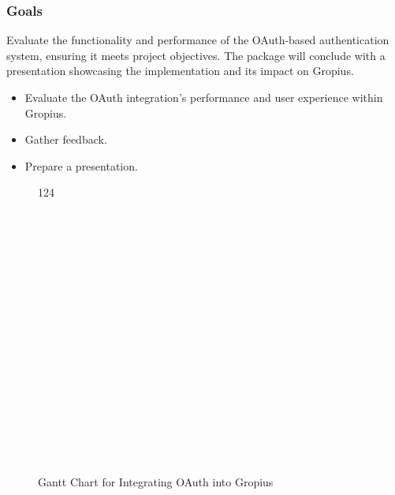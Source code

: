 
\subsubsection{Goals}
Evaluate the functionality and performance of the OAuth-based authentication system, ensuring it meets project objectives. The package will conclude with a presentation showcasing the implementation and its impact on Gropius.

\begin{itemize}
	\item[T5.1] Evaluate the OAuth integration’s performance and user experience within Gropius.
	\item[T5.2] Gather feedback.
	\item[T5.3] Prepare a presentation.
\end{itemize}


\begin{figure}
	\begin{center}
		\begin{ganttchart}[
			x unit=0.6cm,
			y unit title=1cm,
			vgrid,hgrid]
		{1}{24}
			 \\
			\\

			 \\
			 \\
			 \\

			 \\
			 \\
			 \\

			 \\
			 \\
			 \\
			 \\

			 \\
			 \\
			 \\
			 \\

			 \\
			 \\
		\end{ganttchart}
	\end{center}
	\caption{Gantt Chart for Integrating OAuth into Gropius}\label{fig:gantt_chart}
\end{figure}
